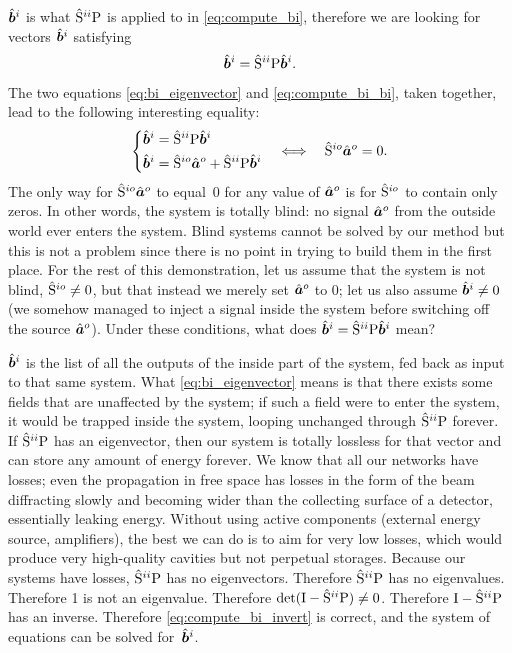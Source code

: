 $\hat{\bm{b}}^i$ is what $\hat{\mathrm{S}}^{ii}\mathrm{P}$ is applied to in \cref{eq:compute_bi}, therefore we are looking for vectors $\hat{\bm{b}}^i$ satisfying
\begin{equation}
    \hat{\bm{b}}^i = \hat{\mathrm{S}}^{ii}\mathrm{P} \hat{\bm{b}}^i \text{.} \label{eq:bi_eigenvector}
\end{equation}
The two equations \cref{eq:bi_eigenvector} and  \cref{eq:compute_bi_bi}, taken together, 
lead to the following interesting equality:
\begin{equation}
    \left\lbrace
        \begin{aligned}
            \vectcp{b}^i &= \matrcp{S}^{ii}\matr{P} \vectcp{b}^i \\
            \vectcp{b}^i &= \matrcp{S}^{io}\vectcp{a}^o + \matrcp{S}^{ii}\matr{P} \vectcp{b}^i
        \end{aligned}
    \right.
    \quad
    \Longleftrightarrow
    \quad
    \matrcp{S}^{io}\vectcp{a}^o = 0
    \text{.}
\end{equation}
The only way for $\hat{\mathrm{S}}^{io}\hat{\bm{a}}^o$ to equal~0 for any value of $\hat{\bm{a}}^o$ is for $\hat{\mathrm{S}}^{io}$ to contain only zeros.
In other words, the system is totally blind: no signal $\hat{\bm{a}}^o$ from the outside world ever enters the system.
Blind systems cannot be solved by our method but this is not a problem since there is no point in trying to build them in the first place.
For the rest of this demonstration, let us assume that the system is not blind, $\hat{\mathrm{S}}^{io}\neq 0$, but that instead we merely set $\hat{\bm{a}}^o$ to 0; let us also assume $\hat{\bm{b}}^i \neq 0$ (we somehow managed to inject a signal inside the system before switching off the source $\hat{\bm{a}}^o$).
Under these conditions, what does $\hat{\bm{b}}^i = \hat{\mathrm{S}}^{ii} \mathrm{P} \hat{\bm{b}}^i$ mean?

$\hat{\bm{b}}^i$ is the list of all the outputs of the inside part of the system, fed back as input to that same system.
What \cref{eq:bi_eigenvector} means is that there exists some fields that are unaffected by the system; if such a field were to enter the system, it would be trapped inside the system, looping unchanged through $\hat{\mathrm{S}}^{ii}\mathrm{P}$ forever.
If $\hat{\mathrm{S}}^{ii}\mathrm{P}$ has an eigenvector, then our system is totally lossless for that vector and can store any amount of energy forever.
We know that all our networks have losses; even the propagation in free space has losses in the form of the beam diffracting slowly and becoming wider than the collecting surface of a detector, essentially leaking energy.
Without using active components (external energy source, amplifiers), the best we can do is to aim for very low losses, which would produce very high-quality cavities but not perpetual storages.
Because our systems have losses, $\hat{\mathrm{S}}^{ii}\mathrm{P}$ has no eigenvectors.
Therefore $\hat{\mathrm{S}}^{ii}\mathrm{P}$ has no eigenvalues.
Therefore 1 is not an eigenvalue.
Therefore $\det(\mathrm{I}-\hat{\mathrm{S}}^{ii}\mathrm{P}) \neq 0$.
Therefore $\mathrm{I}-\hat{\mathrm{S}}^{ii}\mathrm{P}$ has an inverse.
Therefore \cref{eq:compute_bi_invert} is correct, and the system of equations can be solved for~$\hat{\bm{b}}^i$.

